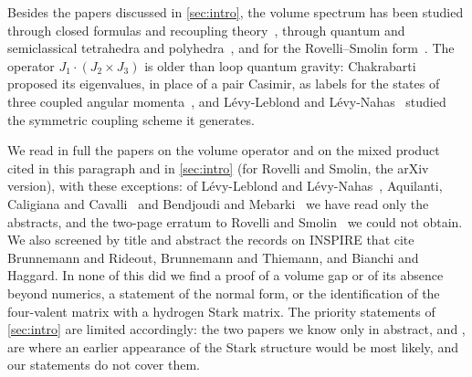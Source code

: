 Besides the papers discussed in \cref{sec:intro}, the volume spectrum has been studied
through closed formulas and recoupling theory~\cite{Thiemann1998,DPR1996,Meissner2006,
MajorSeifert2002,CCM2002,AMM2013,MMA2014,Sherif2026,BRprelim}, through quantum and
semiclassical tetrahedra and polyhedra~\cite{Barbieri1998,BaezBarrett1999,BDS2011,
Haggard2013,BM2017a,BM2017b}, and for the Rovelli--Smolin form~\cite{RS1995,Kis2021}. The
operator $J_1\cdot(J_2\times J_3)$ is older than loop quantum gravity: Chakrabarti
proposed its eigenvalues, in place of a pair Casimir, as labels for the states of three
coupled angular momenta~\cite[p.~301]{Chakrabarti1964}, and L\'evy-Leblond and
L\'evy-Nahas~\cite{LLLN1965} studied the symmetric coupling scheme it generates.

We read in full the papers on the volume operator and on the mixed product cited in this
paragraph and in \cref{sec:intro} (for Rovelli and Smolin, the arXiv version), with these
exceptions: of L\'evy-Leblond and L\'evy-Nahas~\cite{LLLN1965}, Aquilanti, Caligiana and
Cavalli~\cite{ACC2003} and Bendjoudi and Mebarki~\cite{BM2017a,BM2017b} we have read only
the abstracts, and the two-page erratum to Rovelli and Smolin~\cite{RS1995} we could not
obtain. We also screened by title and abstract the records on INSPIRE that cite
Brunnemann and Rideout, Brunnemann and Thiemann, and Bianchi and Haggard. In none of this
did we find a proof of a volume gap or of its absence beyond numerics, a statement of the
normal form, or the identification of the four-valent matrix with a hydrogen Stark matrix.
The priority statements of \cref{sec:intro} are limited accordingly: the two papers we
know only in abstract, \cite{LLLN1965} and \cite{ACC2003}, are where an earlier
appearance of the Stark structure would be most likely, and our statements do not cover
them.
